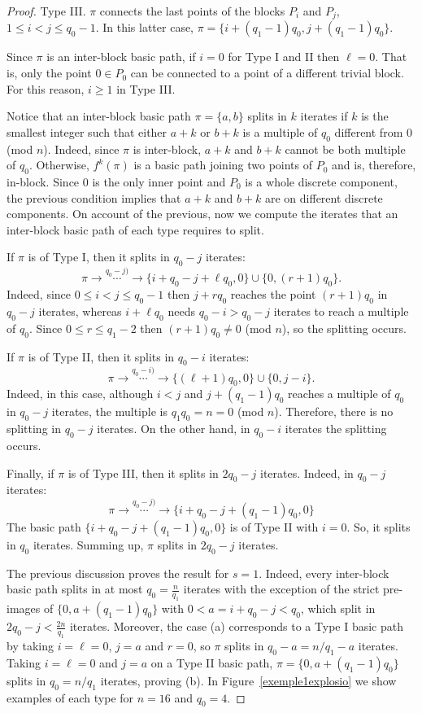 \documentclass[a4paper]{amsart}
\theoremstyle{definition}
\begin{document}
\begin{proof}
Type III. $\pi$ connects the last points of the blocks $P_i$ and $P_j$, $1\leq i<j\leq q_0-1$. In this latter case, $\pi=\{i+(q_1-1)q_0,j+(q_1-1)q_0\}$.

Since $\pi$ is an inter-block basic path, if $i=0$ for Type I and II then $\ell=0$. That is, only the point $0\in P_0$ can be connected to a point of a different trivial block. For this reason, $i\geq 1$ in Type III.

Notice that an inter-block basic path $\pi=\{a,b\}$ splits in $k$ iterates if $k$ is the smallest integer such that either $a+k$ or $b+k$ is a multiple of $q_0$ different from $0$ (mod $n$). Indeed, since $\pi$ is inter-block, $a+k$ and $b+k$ cannot be both multiple of $q_0$. Otherwise, $f^k(\pi)$ is a basic path joining two points of $P_0$ and is, therefore, in-block. Since $0$ is the only inner point and $P_0$ is a whole discrete component, the previous condition implies that $a+k$ and $b+k$ are on different discrete components. On account of the previous, now we compute the iterates that an inter-block basic path of each type requires to split.

If $\pi$ is of Type I, then it splits in $q_0-j$ iterates:
\[ \pi \rightarrow \overset{q_0-j)}{\cdots} \rightarrow \{i+q_0-j+\ell q_0,0\}\cup\{0,(r+1)q_0\}. \]
Indeed, since $0\leq i<j\leq q_0-1$ then $j+rq_0$ reaches the point $(r+1)q_0$ in $q_0-j$ iterates, whereas $i+\ell q_0$ needs $q_0-i>q_0-j$ iterates to reach a multiple of $q_0$. Since $0\leq r\leq q_1-2$ then $(r+1)q_0\neq 0$ (mod $n$), so the splitting occurs.

If $\pi$ is of Type II, then it splits in $q_0-i$ iterates:
\[ \pi \rightarrow \overset{q_0-i)}{\cdots} \rightarrow \{(\ell+1)q_0,0\}\cup\{0,j-i\}. \]
Indeed, in this case, although $i<j$ and $j+(q_1-1)q_0$ reaches a multiple of $q_0$ in $q_0-j$ iterates, the multiple is $q_1q_0=n=0$ (mod $n$). Therefore, there is no splitting in $q_0-j$ iterates. On the other hand, in $q_0-i$ iterates the splitting occurs.

Finally, if $\pi$ is of Type III, then it splits in $2q_0-j$ iterates. Indeed, in $q_0-j$ iterates:
\[ \pi \rightarrow \overset{q_0-j)}{\cdots} \rightarrow \{i+q_0-j+(q_1-1)q_0,0\}\]
The basic path $\{i+q_0-j+(q_1-1)q_0,0\}$ is of Type II with $i=0$. So, it splits in $q_0$ iterates. Summing up, $\pi$ splits in $2q_0-j$ iterates.

The previous discussion proves the result for $s=1$. Indeed, every inter-block basic path splits in at most $q_0=\frac{n}{q_1}$ iterates with the exception of the strict pre-images of $\{0,a+(q_1-1)q_0\}$ with $0<a=i+q_0-j<q_0$, which split in $2q_0-j<\frac{2n}{q_1}$ iterates. Moreover, the case (a) corresponds to a Type I basic path by taking $i=\ell=0$, $j=a$ and $r=0$, so $\pi$ splits in $q_0-a=n/q_1-a$ iterates.
Taking $i=\ell=0$ and $j=a$ on a Type II basic path, $\pi=\{0,a+(q_1-1)q_0\}$ splits in $q_0=n/q_1$ iterates, proving (b). In Figure~\ref{exemple1explosio} we show examples of each type for $n=16$ and $q_0=4$.


\end{proof}
\end{document}
